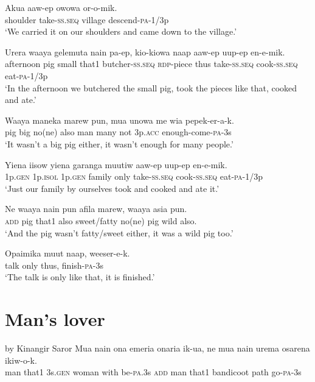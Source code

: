 \ea
\gll  Akua  aaw-ep  owowa  or-o-mik. \\
shoulder  take-\textsc{ss.seq}  village  descend-\textsc{pa}-1/3p \\
\glt ‘We carried it on our shoulders and came down to the village.’ \\
\z


\ea
\gll  Urera  waaya  gelemuta  nain  pa-ep,  kio-kiowa  naap  aaw-ep         uup-ep  en-e-mik. \\
afternoon  pig  small  that1  butcher-\textsc{ss.seq}  \textsc{rdp}-piece  thus  take-\textsc{ss.seq}  cook-\textsc{ss.seq}  eat-\textsc{pa}-1/3p \\


\glt ‘In the afternoon we butchered the small pig, took the pieces like that, cooked and ate.’ \\
\z


\ea
\gll  Waaya  maneka  marew  pun,  mua  unowa  me  wia  pepek-er-a-k. \\
pig  big  no(ne)  also  man  many  not  3p.\textsc{acc}  enough-come-\textsc{pa}-3s \\
\glt ‘It wasn’t a big pig either, it wasn’t enough for many people.’ \\
\z


\ea
\gll  Yiena  iisow  yiena  garanga  muutiw  aaw-ep  uup-ep         en-e-mik. \\
1p.\textsc{gen}  1p.\textsc{isol}  1p.\textsc{gen}  family  only  take-\textsc{ss.seq}  cook-\textsc{ss.seq}    eat-\textsc{pa}-1/3p \\


\glt ‘Just our family by ourselves took and cooked and ate it.’ \\
\z


\ea
\gll  Ne  waaya  nain  pun  afila  marew,  waaya  asia  pun. \\
\textsc{add}  pig  that1  also  sweet/fatty  no(ne)  pig  wild  also. \\
\glt ‘And the pig wasn’t fatty/sweet either, it was a wild pig too.’ \\
\z


\ea
\gll  Opaimika  muut  naap,  weeser-e-k. \\
talk  only  thus,  finish-\textsc{pa}-3s \\
\glt ‘The talk is only like that, it is finished.’ \\
\z


\setcounter{equation}{0}
\section{ Man’s lover}
   by Kinangir Saror
\ea
\gll  Mua  nain  ona  emeria  onaria  ik-ua,  ne  mua  nain  urema  osarena  ikiw-o-k. \\
man  that1  3s.\textsc{gen}  woman  with  be-\textsc{pa}.3s  \textsc{add}  man  that1  bandicoot  path  go-\textsc{pa}-3s \\


